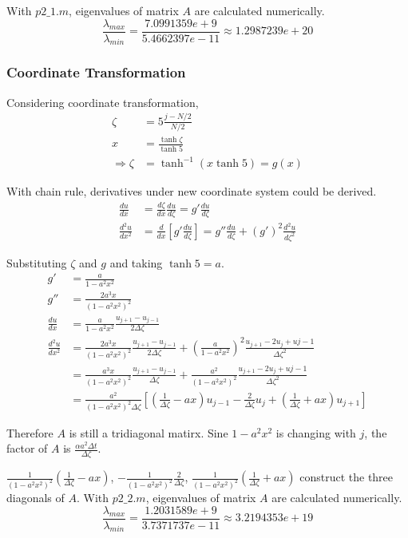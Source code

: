 \documentclass[letterpaper,10pt]{article}
\begin{document}
With $p2\_1.m$, eigenvalues of matrix $A$ are calculated numerically. 
\begin{equation*}
  \frac{\lambda_{max}}{\lambda_{min}}=\frac{7.0991359e+9}{5.4662397e-11}\approx 1.2987239e+20
\end{equation*}
\subsubsection{Coordinate Transformation}
Considering coordinate transformation, 
\begin{align*}
  \zeta &= 5\frac{j-N/2}{N/2}\\
  x&= \frac{\tanh \zeta}{\tanh 5}\\
  \Rightarrow \zeta &= \tanh ^{-1} (x \tanh 5) = g(x)
\end{align*}

With chain rule, derivatives under new coordinate system could be derived. 
\begin{align*}
  \frac{du}{dx}&= \frac{d \zeta}{dx}\frac{du}{d\zeta}=g'\frac{du}{d\zeta}\\
  \frac{d^2 u}{dx^2} &= \frac{d}{d x}\left[g'\frac{du}{d\zeta}\right]=g''\frac{du}{d\zeta}+(g')^2\frac{d^2u}{d\zeta^2}
\end{align*}

Substituting $\zeta$ and $g$ and taking $\tanh 5 = a$. 
\begin{align*}
  g' &= \frac{a}{1-a^2x^2}\\
  g''&= \frac{2a^3x}{(1-a^2x^2)^2}\\
  \frac{du}{dx}&= \frac{a}{1-a^2x^2}\frac{u_{j+1}-u_{j-1}}{2\Delta \zeta}\\
  \frac{d^2 u}{dx^2} &= \frac{2a^3x}{(1-a^2x^2)^2}\frac{u_{j+1}-u_{j-1}}{2\Delta \zeta} + \left(\frac{a}{1-a^2x^2}\right)^2 \frac{u_{j+1}-2u_j+u{j-1}}{\Delta \zeta^2}\\
  &= \frac{a^3x}{(1-a^2x^2)^2}\frac{u_{j+1}-u_{j-1}}{\Delta \zeta} + \frac{a^2}{(1-a^2x^2)^2} \frac{u_{j+1}-2u_j+u{j-1}}{\Delta \zeta^2}\\
  &= \frac{a^2}{(1-a^2x^2)^2\Delta \zeta}\left[\left(\frac{1}{\Delta \zeta}-ax\right)u_{j-1}-\frac{2}{\Delta \zeta}u_j+\left(\frac{1}{\Delta \zeta}+ax\right)u_{j+1}\right]
\end{align*}

Therefore $A$ is still a tridiagonal matirx. Sine $1-a^2x^2$ is changing with $j$, the factor of $A$ is $\frac{\alpha a^2 \Delta t}{\Delta \zeta}$. 

$\frac{1}{(1-a^2x^2)^2}\left(\frac{1}{\Delta \zeta}-ax\right)$, $-\frac{1}{(1-a^2x^2)^2}\frac{2}{\Delta \zeta}$, $\frac{1}{(1-a^2x^2)^2}\left(\frac{1}{\Delta \zeta}+ax\right)$ 
construct the three diagonals of $A$. With $p2\_2.m$, eigenvalues of matrix $A$ are calculated numerically. 
\begin{equation*}
  \frac{\lambda_{max}}{\lambda_{min}}=\frac{1.2031589e+9}{3.7371737e-11}\approx 3.2194353e+19
\end{equation*}
\end{document}

